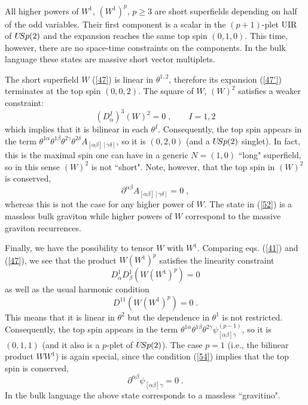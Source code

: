 \documentclass[a4paper,12pt]{article}
\begin{document}
All higher powers of $W^1$, $(W^1)^p$, $p\geq 3$ are short 
superfields depending on half of the odd variables. Their first 
component is a scalar in the $(p+1)$-plet UIR of $U\hskip-2pt 
Sp(2)$ and the expansion reaches the same top spin $(0,1,0)$. This 
time, however, there are no space-time constraints on the 
components. In the bulk language these states are massive short vector multiplets.

 
The short superfield $W$ (\ref{47}) is linear in $\theta^{1,2}$, 
therefore its expansion (\ref{47'}) terminates at the top spin 
$(0,0,2)$. The square of $W$, $(W)^2$ satisfies a weaker 
constraint: 
\begin{equation}\label{51}
  (D^I_\alpha)^3(W)^2=0\;, \qquad I=1,2
\end{equation}
which implies that it is bilinear in each $\theta^I$. 
Consequently, the top spin appears in the term 
$\theta^{1\alpha}\theta^{1\beta}\theta^{2\gamma}\theta^{2\delta} 
A_{[\alpha\beta][\gamma\delta]}$, so it is $(0,2,0)$ (and a 
$U\hskip-2pt Sp(2)$ singlet). In fact, this is the maximal spin 
one can have in a generic $N=(1,0)$ 
 ``long" superfield, so in this sense $(W)^2$ is not ``short". Note, 
however, that the top spin in $(W)^2$ is conserved, 
\begin{equation}\label{52}
 \partial^{\alpha\beta}  A_{[\alpha\beta][\gamma\delta]}=0\;,
\end{equation}
whereas this is not the case for any higher power of $W$. The state in (\ref{52})
is a massless bulk graviton while higher powers of $W$ correspond to the massive
graviton recurrences. 

Finally, we have the possibility to tensor $W$ with $W^1$. 
Comparing eqs. (\ref{41}) and (\ref{47}), we see that the product 
$W(W^1)^p$ satisfies the linearity constraint
\begin{equation}\label{53}
  D^1_\alpha D^1_\beta (W(W^1)^p) =0
\end{equation}
as well as the usual harmonic condition
\begin{equation}\label{54}
  D^{11} (W(W^1)^p) =0\;.
\end{equation}
This means that it is linear in $\theta^2$ but the dependence in 
$\theta^1$ is not restricted. Consequently, the top spin appears 
in the term $\theta^{1\alpha}\theta^{1\beta}\theta^{2\gamma} 
\psi^{(p-1)}_{[\alpha\beta]\gamma}$, so it is $(0,1,1)$ (and it 
also is a $p$-plet of $U\hskip-2pt Sp(2)$). The case $p=1$ (i.e., 
the bilinear product $WW^1$) is again special, since the condition 
(\ref{54}) implies that the top spin is conserved, 
\begin{equation}\label{55}
  \partial^{\alpha\beta}\psi_{[\alpha\beta]\gamma} = 0\;.
\end{equation}
In the bulk language the above state corresponds to a massless ``gravitino".
\end{document}

